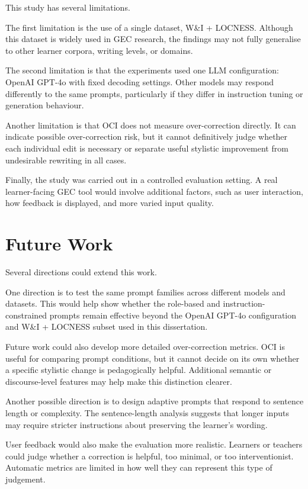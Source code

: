 This study has several limitations.

The first limitation is the use of a single dataset, W\&I + LOCNESS. Although this dataset is widely used in GEC research, the findings may not fully generalise to other learner corpora, writing levels, or domains.

The second limitation is that the experiments used one LLM configuration: OpenAI GPT-4o with fixed decoding settings. Other models may respond differently to the same prompts, particularly if they differ in instruction tuning or generation behaviour.

Another limitation is that OCI does not measure over-correction directly. It can indicate possible over-correction risk, but it cannot definitively judge whether each individual edit is necessary or separate useful stylistic improvement from undesirable rewriting in all cases.

Finally, the study was carried out in a controlled evaluation setting. A real learner-facing GEC tool would involve additional factors, such as user interaction, how feedback is displayed, and more varied input quality.

\section{Future Work}

Several directions could extend this work.

One direction is to test the same prompt families across different models and datasets. This would help show whether the role-based and instruction-constrained prompts remain effective beyond the OpenAI GPT-4o configuration and W\&I + LOCNESS subset used in this dissertation.

Future work could also develop more detailed over-correction metrics. OCI is useful for comparing prompt conditions, but it cannot decide on its own whether a specific stylistic change is pedagogically helpful. Additional semantic or discourse-level features may help make this distinction clearer.

Another possible direction is to design adaptive prompts that respond to sentence length or complexity. The sentence-length analysis suggests that longer inputs may require stricter instructions about preserving the learner's wording.

User feedback would also make the evaluation more realistic. Learners or teachers could judge whether a correction is helpful, too minimal, or too interventionist. Automatic metrics are limited in how well they can represent this type of judgement.

